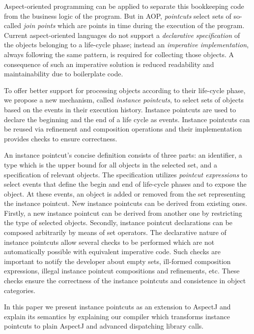 Aspect-oriented programming can be applied to separate this bookkeeping code from the business logic of the program. But in AOP, \emph{pointcuts} select sets of so-called \emph{join points} which are points in time during the execution of the program. Current aspect-oriented languages do not support a \emph{declarative specification} of the objects belonging to a life-cycle phase; instead an \emph{imperative implementation}, always following the same pattern, is required for collecting those objects.
A consequence of such an imperative solution is reduced readability and maintainability due to boilerplate code.


To offer better support for processing objects according to their life-cycle phase, we propose a new mechanism, called \emph{instance pointcuts}, to select sets of objects based on the events in their execution history.
Instance pointcuts are used to declare the beginning and the end of a life cycle as events. Instance pointcuts can be reused via refinement and composition operations and their implementation provides checks to ensure correctness. 

An instance pointcut's concise definition consists of three parts: an identifier, a type which is the upper bound for all objects in the selected set, and a specification of relevant objects.
The specification utilizes \emph{pointcut expressions} to select events that define the begin and end of life-cycle phases and to expose the object. At these events, an object is added or removed from the set representing the instance pointcut. 
New instance pointcuts can be derived from existing ones. Firstly, a new instance pointcut can be derived from another one by restricting the type of selected objects. 
Secondly, instance pointcut declarations can be composed arbitrarily by means of set operators. 
The declarative nature of instance pointcuts allow several checks to be performed which are not automatically possible with equivalent imperative code. Such checks are important to notify the developer about empty sets, ill-formed composition expressions,  illegal instance pointcut compositions and refinements, etc.  These checks ensure the correctness of the instance pointcuts and consistence in object categories. 

In this paper we present instance pointcuts as an extension to AspectJ \cite{kiczales2001overview} and explain its semantics by explaining our compiler which transforms instance pointcuts to plain AspectJ and advanced dispatching library calls. 


